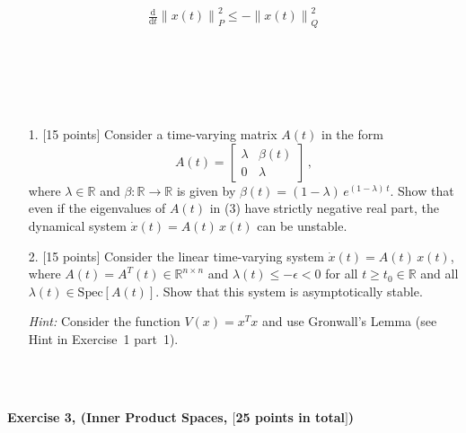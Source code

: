 \documentclass[a4paper,10.5pt]{article}
\newcommand{\de}{\mathrm{d}}
\newcommand{\R}{\mathbb{R}}
\newcommand{\norm}[1]{\left\lVert#1\right\rVert}
\begin{document}
 \\
\begin{align*}
\frac{\de}{\de t} \norm{x(t)}_P^2 \leq -\norm{x(t)}_Q^2
\end{align*}

 \\

 \\

 \\

 \\

\clearpage


\begin{itemize}
\item[1.] $[$15 points$]$  Consider a time-varying matrix $A(t)$ in the form
\begin{equation}
A(t) = \begin{bmatrix}\lambda & \beta(t)\\ 0 & \lambda\end{bmatrix}\,, \tag{3}
\end{equation}
where $\lambda \in \mathbb{R}$ and $\beta\colon \R \to \mathbb{R}$ is given by $\beta(t) = ({1 - \lambda})\, e^{(1 - \lambda)\, t}$. Show that even if the eigenvalues of $A(t)$ in (3) have strictly negative real part,  the dynamical system $\dot{x}(t) = A(t)\, x(t)$ can be unstable.


\item[2.] $[$15 points$]$ Consider the linear time-varying system $\dot{x}(t) = A(t)\, x(t)$, where $A(t) = A^T(t) \in \R^{n \times n}$ and $\lambda(t) \leq -\epsilon < 0$ for all $t \geq t_0 \in \mathbb{R}$ and all $\lambda(t) \in \text{Spec}[A(t)]$. Show that this system is asymptotically stable.

{\em Hint:} Consider the function $V(x)=x^Tx$ and use Gronwall's Lemma (see Hint in Exercise~1 part~1).
\end{itemize} 

 \\

 \\

\clearpage

{\bf Exercise 3, (Inner Product Spaces, $[$25 points in total$]$)}
\end{document}
